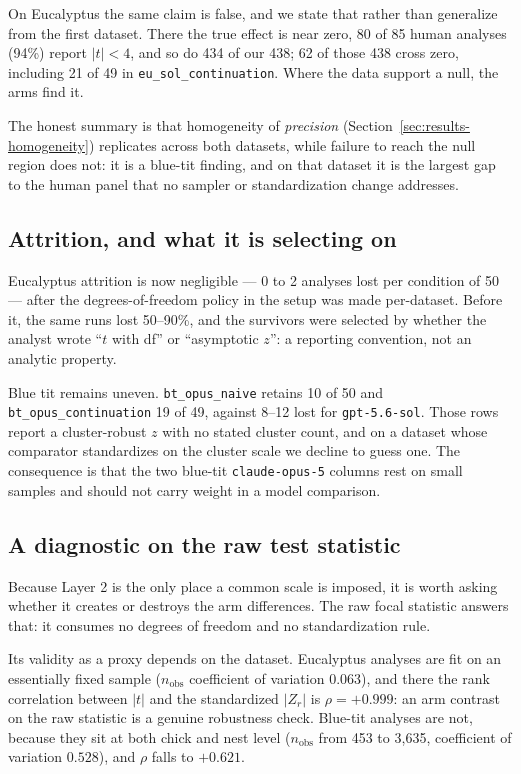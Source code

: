 \documentclass{article}
\begin{document}
On Eucalyptus the same claim is false, and we state that rather than generalize
from the first dataset. There the true effect is near zero, 80 of 85 human
analyses (94\%) report $|t| < 4$, and so do 434 of our 438; 62 of those 438
cross zero, including 21 of 49 in \texttt{eu\_sol\_continuation}. Where
the data support a null, the arms find it.

The honest summary is that homogeneity of \emph{precision}
(Section~\ref{sec:results-homogeneity}) replicates across both datasets, while
failure to reach the null region does not: it is a blue-tit finding, and on that
dataset it is the largest gap to the human panel that no sampler or
standardization change addresses.

\subsection{Attrition, and what it is selecting on}
\label{sec:results-attrition}

Eucalyptus attrition is now negligible --- 0 to 2 analyses lost per condition of
50 --- after the degrees-of-freedom policy in the setup was made per-dataset.
Before it, the same runs lost 50--90\%, and the survivors were selected by
whether the analyst wrote ``$t$ with df'' or ``asymptotic $z$'': a reporting
convention, not an analytic property.

Blue tit remains uneven. \texttt{bt\_opus\_naive} retains 10 of 50 and
\texttt{bt\_opus\_continuation} 19 of 49, against 8--12 lost for
\texttt{gpt-5.6-sol}. Those rows report a cluster-robust $z$ with no stated
cluster count, and on a dataset whose comparator standardizes on the cluster
scale we decline to guess one. The consequence is that the two blue-tit
\texttt{claude-opus-5} columns rest on small samples and should not carry weight
in a model comparison.

\subsection{A diagnostic on the raw test statistic}
\label{sec:results-teststat}

Because Layer 2 is the only place a common scale is imposed, it is worth asking
whether it creates or destroys the arm differences. The raw focal statistic
answers that: it consumes no degrees of freedom and no standardization rule.

Its validity as a proxy depends on the dataset. Eucalyptus analyses are fit on
an essentially fixed sample ($n_{\text{obs}}$ coefficient of variation $0.063$),
and there the rank correlation between $|t|$ and the standardized $|Z_r|$ is
$\rho = +0.999$: an arm contrast on the raw statistic is a genuine robustness
check. Blue-tit analyses are not, because they sit at both chick and nest level
($n_{\text{obs}}$ from 453 to 3{,}635, coefficient of variation $0.528$), and
$\rho$ falls to $+0.621$.
\end{document}
